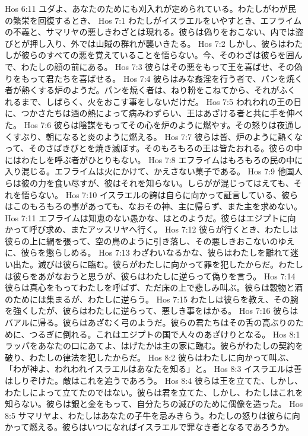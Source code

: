 Hos 6:11  ユダよ、あなたのためにも刈入れが定められている。わたしがわが民の繁栄を回復するとき、
Hos 7:1  わたしがイスラエルをいやすとき、エフライムの不義と、サマリヤの悪しきわざとは現れる。彼らは偽りをおこない、内では盗びとが押し入り、外では山賊の群れが襲いきたる。
Hos 7:2  しかし、彼らはわたしが彼らのすべての悪を覚えていることを悟らない。今、そのわざは彼らを囲んで、わたしの顔の前にある。
Hos 7:3  彼らはその悪をもって王を喜ばせ、その偽りをもって君たちを喜ばせる。
Hos 7:4  彼らはみな姦淫を行う者で、パンを焼く者が熱くする炉のようだ。パンを焼く者は、ねり粉をこねてから、それがふくれるまで、しばらく、火をおこす事をしないだけだ。
Hos 7:5  われわれの王の日に、つかさたちは酒の熱によって病みわずらい、王はあざける者と共に手を伸べた。
Hos 7:6  彼らは陰謀をもってその心を炉のように燃やす。その怒りは夜通しくすぶり、朝になると炎のように燃える。
Hos 7:7  彼らは皆、炉のように熱くなって、そのさばきびとを焼き滅ぼす。そのもろもろの王は皆たおれる。彼らの中にはわたしを呼ぶ者がひとりもない。
Hos 7:8  エフライムはもろもろの民の中に入り混じる。エフライムは火にかけて、かえさない菓子である。
Hos 7:9  他国人らは彼の力を食い尽すが、彼はそれを知らない。しらがが混じってはえても、それを悟らない。
Hos 7:10  イスラエルの誇は自らに向かって証言している、彼らはこのもろもろの事があっても、なおその神、主に帰らず、また主を求めない。
Hos 7:11  エフライムは知恵のない愚かな、はとのようだ。彼らはエジプトに向かって呼び求め、またアッスリヤへ行く。
Hos 7:12  彼らが行くとき、わたしは彼らの上に網を張って、空の鳥のように引き落し、その悪しきおこないのゆえに、彼らを懲らしめる。
Hos 7:13  わざわいなるかな、彼らはわたしを離れて迷い出た。滅びは彼らに臨む。彼らがわたしに向かって罪を犯したからだ。わたしは彼らをあがなおうと思うが、彼らはわたしに逆らって偽りを言う。
Hos 7:14  彼らは真心をもってわたしを呼ばず、ただ床の上で悲しみ叫ぶ。彼らは穀物と酒のためには集まるが、わたしに逆らう。
Hos 7:15  わたしは彼らを教え、その腕を強くしたが、彼らはわたしに逆らって、悪しき事をはかる。
Hos 7:16  彼らはバアルに帰る。彼らはあざむく弓のようだ。彼らの君たちはその舌の高ぶりのために、つるぎに倒れる。これはエジプトの国で人々のあざけりとなる。
Hos 8:1  ラッパをあなたの口にあてよ、はげたかは主の家に臨む。彼らがわたしの契約を破り、わたしの律法を犯したからだ。
Hos 8:2  彼らはわたしに向かって叫ぶ、「わが神よ、われわれイスラエルはあなたを知る」と。
Hos 8:3  イスラエルは善はしりぞけた。敵はこれを追うであろう。
Hos 8:4  彼らは王を立てた、しかし、わたしによって立てたのではない。彼らは君を立てた、しかし、わたしはこれを知らない。彼らは銀と金をもって、自分たちの滅びのために偶像を造った。
Hos 8:5  サマリヤよ、わたしはあなたの子牛を忌みきらう。わたしの怒りは彼らに向かって燃える。彼らはいつになればイスラエルで罪なき者となるであろうか。
